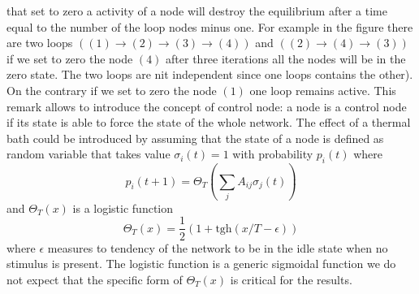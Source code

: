 that set to zero a activity of a node will destroy the equilibrium after a time equal to the number of the loop nodes minus one.
For example in the figure there are two loops $((1)\to (2)\to (3)\to (4))$ and $((2)\to(4)\to (3))$ if we set to zero the node 
$(4)$ after three iterations all the nodes will be in the zero state. The two loops are nit independent since one loops contains the other). On the contrary if we set to zero the node $(1)$ one loop remains active. This remark allows to introduce the concept of control node: a node is a control node if its state is able to 
force the state of the whole network. The effect of a thermal bath could be introduced by assuming that the state of a node
is defined as random variable that takes value $\sigma_i(t)=1$ with probability $p_i(t)$ where 
\begin{equation}
p_i(t+1)=\Theta_T\left (\sum_j A_{ij}\sigma_j(t)\right )
\label{stocdyn}
\end{equation}
and $\Theta_T(x)$ is a logistic function 
$$
\Theta_T(x)=\frac{1}{2}\left (1+\textrm{tgh}(x/T-\epsilon)\right )
$$
where $\epsilon$ measures to tendency of the network to be in the idle state when no stimulus is present.
The logistic function is a generic sigmoidal function we do not expect that the specific form of $\Theta_T(x)$ is critical for the results.
\par\noindent



